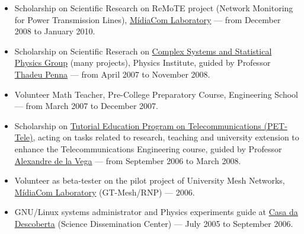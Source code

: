 \documentclass[a4paper,11pt]{article}
\begin{document}
	\begin{itemize}
		\item Scholarship on Scientific Research on ReMoTE project (Network
			Monitoring for Power Transmission Lines),
			\href{http://www.midiacom.uff.br/ }{MídiaCom Laboratory} --- from
			December 2008 to January 2010.
		\item Scholarship on Scientific Reserach on
			\href{http://complex.if.uff.br/}{Complex Systems and Statistical
			Physics Group} (many projects), Physics Institute, guided by
			Professor \href{http://profs.if.uff.br/tjpp/}{Thadeu Penna} ---
			from April 2007 to November 2008.
		\item Volunteer Math Teacher, Pre-College Preparatory Course,
			Engineering School --- from March 2007 to December 2007.
		\item Scholarship on \href{http://pet.telecom.uff.br/}{Tutorial
			Education Program on Telecommunications (PET-Tele)}, acting on
			tasks related to research, teaching and university extension to
			enhance the Telecommunications Engineering course, guided by
			Professor \href{http://www.telecom.uff.br/~delavega/}{Alexandre de
			la Vega} --- from September 2006 to March 2008.
		\item Volunteer as beta-tester on the pilot project of University Mesh
			Networks, \href{http://www.midiacom.uff.br/}{MídiaCom Laboratory}
			(GT-Mesh/RNP) --- 2006.
		\item GNU/Linux systems administrator and Physics experiments guide at
			\href{http://www.uff.br/casadadescoberta/}{Casa da Descoberta}
			(Science Dissemination Center) --- July 2005 to September 2006.
	\end{itemize}
\end{document}
